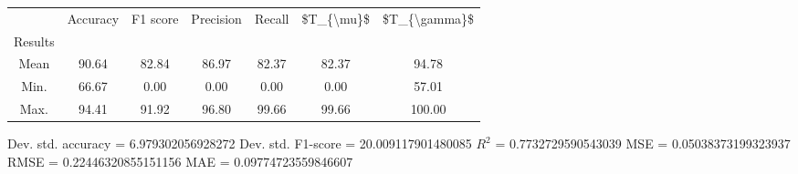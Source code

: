 \begin{tabular}{|c|c|c|c|c|c|c|}
\toprule
{} &  Accuracy &  F1 score &  Precision &  Recall &  \$T\_\{\textbackslash mu\}\$ &  \$T\_\{\textbackslash gamma\}\$ \\
Results &           &           &            &         &            &               \\
\hline
Mean    &     90.64 &     82.84 &      86.97 &   82.37 &      82.37 &         94.78 \\
Min.    &     66.67 &      0.00 &       0.00 &    0.00 &       0.00 &         57.01 \\
Max.    &     94.41 &     91.92 &      96.80 &   99.66 &      99.66 &        100.00 \\
\bottomrule
\end{tabular}

 Dev. std. accuracy = 6.979302056928272
 Dev. std. F1-score = 20.009117901480085
 $R^2$ = 0.7732729590543039
 MSE = 0.05038373199323937
 RMSE = 0.22446320855151156
 MAE = 0.09774723559846607